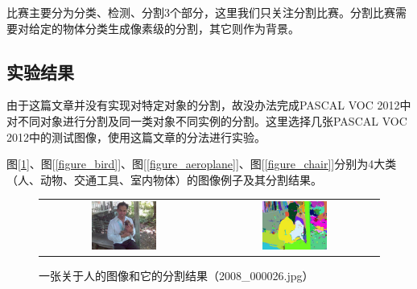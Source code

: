 \documentclass[a4paper, 12pt, UTF8]{article}
\begin{document}
比赛主要分为分类、检测、分割3个部分，这里我们只关注分割比赛。分割比赛需要对给定的物体分类生成像素级的分割，其它则作为背景。

\subsection{实验结果}

由于这篇文章并没有实现对特定对象的分割，故没办法完成PASCAL VOC 2012中对不同对象进行分割及同一类对象不同实例的分割。这里选择几张PASCAL VOC 2012中的测试图像，使用这篇文章的分法进行实验。

图[\ref{figure_person}]、图[\ref{figure_bird}]、图[\ref{figure_aeroplane}]、图[\ref{figure_chair}]分别为4大类（人、动物、交通工具、室内物体）的图像例子及其分割结果。

\begin{figure}[h!]
    \centering
    \begin{tabular}{cc}
        \includegraphics[width=0.4\textwidth]{src/images/2008_000026.jpg} &
        \includegraphics[width=0.4\textwidth]{src/images/2008_000026_output.jpg}
    \end{tabular}
    \caption{一张关于人的图像和它的分割结果（2008\_000026.jpg）}
    \label{figure_person}
\end{figure}
\end{document}
